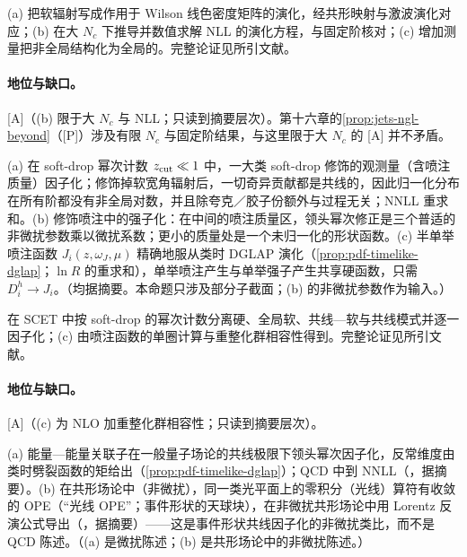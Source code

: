 \begin{proofsketch}
(a) 把软辐射写成作用于 Wilson 线色密度矩阵的演化，经共形映射与激波演化对应；(b) 在大 $N_c$ 下推导并数值求解 NLL 的演化方程，与固定阶核对；(c) 增加测量把非全局结构化为全局的。完整论证见所引文献。
\end{proofsketch}

\paragraph{地位与缺口。}[A]（(b) 限于大 $N_c$ 与 NLL；只读到摘要层次）。第十六章的\cref{prop:jets-ngl-beyond}（[P]）涉及有限 $N_c$ 与固定阶结果，与这里限于大 $N_c$ 的 [A] 并不矛盾。

\begin{proposition}\label{prop:front-jet-substructure}
(a) 在 soft-drop 幂次计数 $z_{\rm cut}\ll1$ 中，一大类 soft-drop 修饰的观测量（含喷注质量）因子化；修饰掉软宽角辐射后，一切奇异贡献都是共线的，因此归一化分布在所有阶都没有非全局对数，并且除夸克／胶子份额外与过程无关；NNLL 重求和\cite{Frye:2016aiz}。(b) 修饰喷注中的强子化：在中间的喷注质量区，领头幂次修正是三个普适的非微扰参数乘以微扰系数；更小的质量处是一个未归一化的形状函数\cite{Hoang:2019ceu}。(c) 半单举喷注函数 $J_i(z,\omega_J,\mu)$ 精确地服从类时 DGLAP 演化（\cref{prop:pdf-timelike-dglap}；$\ln R$ 的重求和），单举喷注产生与单举强子产生共享硬函数，只需 $D_i^h\to J_i$\cite{Kang:2016mcy}。（均据摘要。本命题只涉及部分子截面；(b) 的非微扰参数作为输入。）
\end{proposition}

\begin{proofsketch}
在 SCET 中按 soft-drop 的幂次计数分离硬、全局软、共线—软与共线模式并逐一因子化；(c) 由喷注函数的单圈计算与重整化群相容性得到。完整论证见所引文献。
\end{proofsketch}

\paragraph{地位与缺口。}[A]（(c) 为 NLO 加重整化群相容性；只读到摘要层次）。

\begin{proposition}\label{prop:front-lightray-ope}
(a) 能量—能量关联子在一般量子场论的共线极限下领头幂次因子化，反常维度由类时劈裂函数的矩给出（\cref{prop:pdf-timelike-dglap}）；QCD 中到 NNLL（\cite{Dixon:2019uzg}，据摘要）。(b) 在共形场论中（非微扰），同一类光平面上的零积分（光线）算符有收敛的 OPE（“光线 OPE”；事件形状的天球块），在非微扰共形场论中用 Lorentz 反演公式导出（\cite{Kologlu:2019mfz}，据摘要）——这是事件形状共线因子化的非微扰类比，而不是 QCD 陈述。（(a) 是微扰陈述；(b) 是共形场论中的非微扰陈述。）
\end{proposition}

